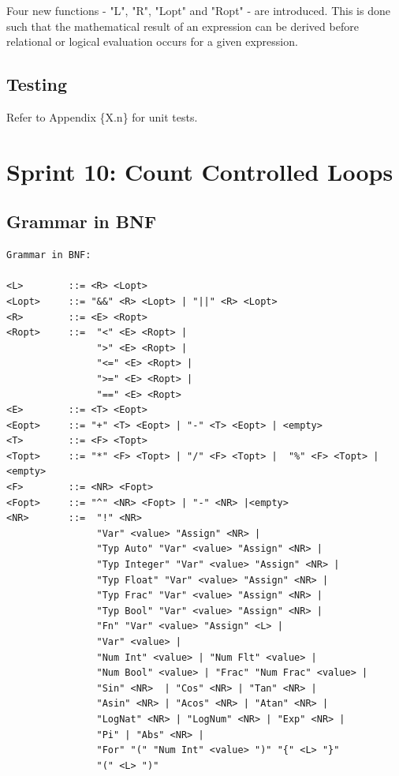 \documentclass[a4paper, oneside, 11pt]{report}
\begin{document}
	Four new functions - "L", "R", "Lopt" and "Ropt" - are introduced. This is done such that the mathematical result of an expression can be derived before relational or logical evaluation occurs for a given expression.

	\subsection{Testing}
	Refer to Appendix \{X.n\} for unit tests.
	\section{Sprint 10: Count Controlled Loops}
	\subsection{Grammar in BNF}
	\begin{verbatim}
Grammar in BNF:

<L>        ::= <R> <Lopt>
<Lopt>     ::= "&&" <R> <Lopt> | "||" <R> <Lopt>
<R>        ::= <E> <Ropt>
<Ropt>     ::=  "<" <E> <Ropt> |
                ">" <E> <Ropt> |
                "<=" <E> <Ropt> |
                ">=" <E> <Ropt> |
                "==" <E> <Ropt>
<E>        ::= <T> <Eopt>
<Eopt>     ::= "+" <T> <Eopt> | "-" <T> <Eopt> | <empty>
<T>        ::= <F> <Topt>
<Topt>     ::= "*" <F> <Topt> | "/" <F> <Topt> |  "%" <F> <Topt> |<empty>
<F>        ::= <NR> <Fopt>
<Fopt>     ::= "^" <NR> <Fopt> | "-" <NR> |<empty>
<NR>       ::=  "!" <NR>
                "Var" <value> "Assign" <NR> |
                "Typ Auto" "Var" <value> "Assign" <NR> |
                "Typ Integer" "Var" <value> "Assign" <NR> |
                "Typ Float" "Var" <value> "Assign" <NR> |
                "Typ Frac" "Var" <value> "Assign" <NR> |
                "Typ Bool" "Var" <value> "Assign" <NR> |
                "Fn" "Var" <value> "Assign" <L> |
                "Var" <value> |
                "Num Int" <value> | "Num Flt" <value> |
                "Num Bool" <value> | "Frac" "Num Frac" <value> |
                "Sin" <NR>  | "Cos" <NR> | "Tan" <NR> |
                "Asin" <NR> | "Acos" <NR> | "Atan" <NR> |
                "LogNat" <NR> | "LogNum" <NR> | "Exp" <NR> |
                "Pi" | "Abs" <NR> |
                "For" "(" "Num Int" <value> ")" "{" <L> "}"
                "(" <L> ")"
	\end{verbatim}
\end{document}
